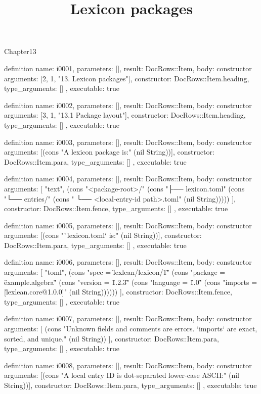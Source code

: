 \begin{lexlean}{Chapter13}
\title{Lexicon packages}
\begin{semanticmodule}
definition{
  name: i0001,
  parameters: [],
  result: DocRows::Item,
  body: constructor{
    arguments: [2, 1, "13. Lexicon packages"],
    constructor: DocRows::Item.heading,
    type_arguments: []
  },
  executable: true
}

definition{
  name: i0002,
  parameters: [],
  result: DocRows::Item,
  body: constructor{
    arguments: [3, 1, "13.1 Package layout"],
    constructor: DocRows::Item.heading,
    type_arguments: []
  },
  executable: true
}

definition{
  name: i0003,
  parameters: [],
  result: DocRows::Item,
  body: constructor{
    arguments: [(cons "A lexicon package is:" (nil String))],
    constructor: DocRows::Item.para,
    type_arguments: []
  },
  executable: true
}

definition{
  name: i0004,
  parameters: [],
  result: DocRows::Item,
  body: constructor{
    arguments: [
      "text",
      (cons "<package-root>/" (cons "├── lexicon.toml" (cons "└── entries/" (cons "    └── <local-entry-id path>.toml" (nil String)))))
    ],
    constructor: DocRows::Item.fence,
    type_arguments: []
  },
  executable: true
}

definition{
  name: i0005,
  parameters: [],
  result: DocRows::Item,
  body: constructor{
    arguments: [(cons "`lexicon.toml` is:" (nil String))],
    constructor: DocRows::Item.para,
    type_arguments: []
  },
  executable: true
}

definition{
  name: i0006,
  parameters: [],
  result: DocRows::Item,
  body: constructor{
    arguments: [
      "toml",
      (cons "spec = \"lexlean/lexicon/1\"" (cons "package = \"example.algebra\"" (cons "version = \"1.2.3\"" (cons "language = \"1.0\"" (cons "imports = [\"lexlean.core@1.0.0\"]" (nil String))))))
    ],
    constructor: DocRows::Item.fence,
    type_arguments: []
  },
  executable: true
}

definition{
  name: i0007,
  parameters: [],
  result: DocRows::Item,
  body: constructor{
    arguments: [
      (cons "Unknown fields and comments are errors. `imports` are exact, sorted, and unique." (nil String))
    ],
    constructor: DocRows::Item.para,
    type_arguments: []
  },
  executable: true
}

definition{
  name: i0008,
  parameters: [],
  result: DocRows::Item,
  body: constructor{
    arguments: [(cons "A local entry ID is dot-separated lower-case ASCII:" (nil String))],
    constructor: DocRows::Item.para,
    type_arguments: []
  },
  executable: true
}


\end{semanticmodule}
\end{lexlean}
